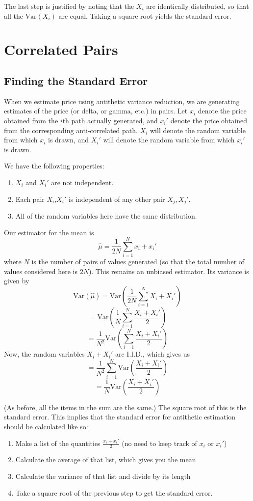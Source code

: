 \documentclass[12pt]{article}
\newcommand{\var}{\ensuremath{\text{Var}}}
\begin{document}
The last step is justified by noting that the $X_i$ are identically
distributed, so that all the $\var(X_i)$ are equal.  Taking a square
root yields the standard error.

\section{Correlated Pairs}

\subsection{Finding the Standard Error}

When we estimate price using antithetic variance reduction, we are
generating estimates of the price (or delta, or gamma, etc.) in pairs.  Let $x_i$ denote the
price obtained from the $i$th path actually generated, and $x_i'$ denote the
price obtained from the corresponding anti-correlated path.  $X_i$
will denote the random variable from which $x_i$ is drawn, and $X_i'$
will denote the random variable from which $x_i'$ is drawn.

We have the following properties:
\begin{enumerate}
\item $X_i$ and $X_i'$ are not independent.
\item Each pair $X_i$,$X_i'$ is independent of any other pair
  $X_j,X_j'$.
\item All of the random variables here have the same distribution.
\end{enumerate}

Our estimator for the mean is
$$ \hat{\mu} = \frac{1}{2N} \sum_{i=1}^N x_i + x_i' $$
where $N$ is the number of pairs of values generated (so that the
total number of values considered here is $2N$).  This remains an
unbiased estimator.  Its variance is given by
$$ \var(\hat{\mu}) = \var \left( \frac{1}{2N} \sum_{i=1}^N
  X_i + X_i' \right) $$
$$ = \var \left( \frac{1}{N} \sum_{i=1}^N \frac{X_i + X_i'}{2}
\right) $$
$$ = \frac{1}{N^2} \var \left( \sum_{i=1}^N \frac{X_i + X_i'}{2}
\right) $$
Now, the random variables $X_i + X_i'$ are I.I.D., which gives us
$$ = \frac{1}{N^2} \sum_{i = 1}^N \var \left( \frac{X_i + X_i'}{2}
\right) $$
$$ = \frac{1}{N} \var \left( \frac{X_i + X_i'}{2} \right) $$

(As before, all the items in the sum are the same.)  The square root of this is the standard error.  This implies that the
standard error for antithetic estimation should be calculated like so:
\begin{enumerate}
\item Make a list of the quantities $\frac{x_i + x_i'}{2}$ (no need to
  keep track of $x_i$ or $x_i'$)
\item Calculate the average of that list, which gives you the mean
\item Calculate the variance of that list and divide by its length
\item Take a square root of the previous step to get the standard error.
\end{enumerate}
\end{document}
